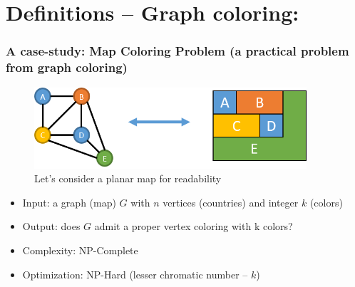 \documentclass{beamer}
\begin{document}

\section{Definitions -- Graph coloring:}
\begin{frame}[fragile] 
	\frametitle{A case-study: Map Coloring Problem (a practical problem from graph coloring)}
		
	
\begin{figure}[tbp]
  \centering
	 \includegraphics[width=0.9\textwidth , height=0.3\textheight] {graph_coloring_equivalence.png}
  \caption{Let's consider a planar map for readability}
	
	\end{figure}
{\small	
\begin{block}{}
  \begin{itemize}
  \item Input: a graph (map) $G$ with $n$ vertices (countries) and  integer $k$ (colors)
  \item Output: does $G$ admit a proper vertex coloring with k colors?
  \item Complexity:	NP-Complete
  \item Optimization: NP-Hard (lesser chromatic number -- $k$)
     \end{itemize}
 \end{block}
}

\end{frame}
\end{document}
